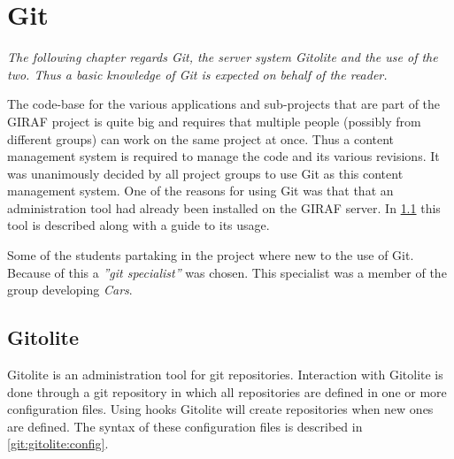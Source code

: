 \chapter{Git}
\newcommand{\git}{Git}\newcommand{\Git}{Git}
\newcommand{\gitolite}{Gitolite}\newcommand{\Gitolite}{Gitolite}
\begin{center}
\textit{The following chapter regards \git{}, the server system \gitolite{} and the use of the two.
Thus a basic knowledge of \git{} is expected on behalf of the reader.}
\end{center}
The code-base for the various applications and sub-projects that are part of the GIRAF project is quite big and requires that multiple people (possibly from different groups) can work on the same project at once.
Thus a content management system is required to manage the code and its various revisions. 
It was unanimously decided by all project groups to use \git{} as this content management system.
One of the reasons for using \git{} was that that an administration tool had already been installed on the GIRAF server.
In \cref{git:gitolite} this tool is described along with a guide to its usage.

Some of the students partaking in the project where new to the use of \git{}.
Because of this a \textit{''git specialist''} was chosen.
This specialist was a member of the group developing \textit{Cars}.

\section{\Gitolite{}}\label{git:gitolite}
\Gitolite{} is an administration tool for git repositories.
Interaction with \gitolite{} is done through a git repository in which all repositories are defined in one or more configuration files.
Using hooks \gitolite{} will create repositories when new ones are defined.
The syntax of these configuration files is described in \cref{git:gitolite:config}.

